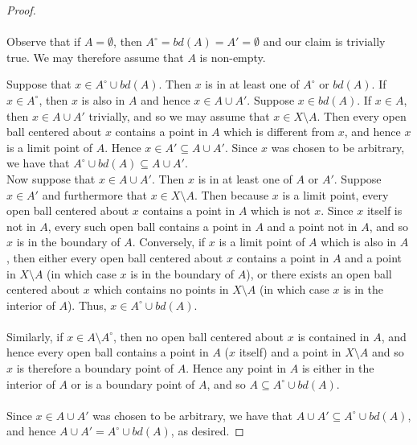 \begin{proof}\renewcommand{\qedsymbol}{}\ \\\\
    Observe that if $A = \emptyset$, then $A^\circ = bd(A) = A' = \emptyset$ and our claim is trivially true. We may
    therefore assume that $A$ is non-empty.

    Suppose that $x \in A^\circ \cup bd(A)$. Then $x$ is in at least one of $A^\circ$ or $bd(A)$. If $x \in A^\circ$, 
    then $x$ is also in $A$ and hence $x \in A \cup A'$.  Suppose $x \in bd(A)$. If $x \in A$, then $x \in A \cup A'$ 
    trivially, and so we may assume that $x \in X \setminus A$. Then every open ball centered about $x$
    contains a point in $A$ which is different from $x$, and hence $x$ is a limit point of $A$. 
    Hence $x \in A' \subseteq A \cup A'$. Since $x$ was chosen to be arbitrary, we have that 
    $A^\circ \cup bd(A) \subseteq A \cup A'$. \\

    Now suppose that $x \in A \cup A'$. Then $x$ is in at least one of $A$ or $A'$. Suppose $x \in A'$ and furthermore
    that $x \in X \setminus A$. Then because $x$ is a limit point, every open ball centered about $x$ contains a point
    in $A$ which is not $x$. Since $x$ itself is not in $A$, every such open ball contains a point in $A$ and a 
    point not in $A$, and so $x$ is in the boundary of $A$. Conversely, if $x$ is
    a limit point of $A$ which is also in $A$, then either every open ball centered about $x$ contains a point in $A$
    and a point in $X \setminus A$ (in which case $x$ is in the boundary of $A$), or there exists an open ball centered 
    about $x$ which contains no points in $X \setminus A$ (in which case $x$ is in the interior of $A$). Thus, 
    $x \in A^\circ \cup bd(A)$. 
    \ \\\\
    Similarly, if $x \in A \setminus A^\circ$, then no open ball centered about $x$ is
    contained in $A$, and hence every open ball contains a point in $A$ ($x$ itself) and a point in $X \setminus A$ and
    so $x$ is therefore a boundary point of $A$. Hence any point in $A$ is either in the interior of $A$ or is a
    boundary point of $A$, and so $A \subseteq A^\circ \cup bd(A)$.
    \ \\\\
    Since $x \in A \cup A'$ was chosen to be arbitrary, we have that $A \cup A' \subseteq A^\circ \cup bd(A)$, and hence 
    $A \cup A' = A^\circ \cup bd(A)$, as desired.
\end{proof}

